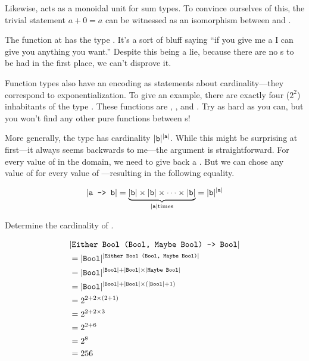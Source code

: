\documentclass[book.tex]{subfiles}
\begin{document}
Likewise,  acts as a monoidal unit for sum types. To convince ourselves
of this, the trivial statement $a+0 = a$ can be witnessed as an isomorphism
between  and .


The function  at  has the type . It's a sort of
bluff saying ``if you give me a  I can give you anything you
want.'' Despite this being a lie, because there are no s to be had in
the first place, we can't disprove it.

Function types also have an encoding as statements about cardinality---they
correspond to exponentialization. To give an example, there are exactly four
($2^2$) inhabitants of the type . These functions are ,
,  and . Try as hard as you can, but you
won't find any other pure functions between s!

More generally, the type  has cardinality $\lvert\texttt{b}\rvert^{\lvert\texttt{a}\rvert}$.
While this might be surprising at first---it always seems backwards to me---the
argument is straightforward. For every value of  in the domain, we need to
give back a . But we can chose any value of  for every value of
---resulting in the following equality.

$$
\lvert\texttt{a -> b}\rvert = \underbrace{\lvert\texttt{b}\rvert \times \lvert\texttt{b}\rvert \times \cdots \times
\lvert\texttt{b}\rvert}_{\lvert\texttt{a}\rvert \text{times}} = \lvert\texttt{b}\rvert^{\lvert\texttt{a}\rvert}
$$

\begin{exercise}
Determine the cardinality of .
\end{exercise}
\begin{solution}
$$
\begin{align*}
  &  \lvert\texttt{Either Bool (Bool, Maybe Bool) -> Bool}\rvert \\
  &= \lvert\texttt{Bool}\rvert^{\lvert\texttt{Either Bool (Bool, Maybe Bool)}\rvert} \\
  &= \lvert\texttt{Bool}\rvert^{\lvert\texttt{Bool}\rvert+\lvert\texttt{Bool}\rvert\times\lvert\texttt{Maybe Bool}\rvert} \\
  &= \lvert\texttt{Bool}\rvert^{\lvert\texttt{Bool}\rvert+\lvert\texttt{Bool}\rvert\times(\lvert\texttt{Bool}\rvert+1)} \\
  &= 2^{2+2\times(2+1)} \\
  &= 2^{2+2\times 3} \\
  &= 2^{2+6} \\
  &= 2^{8} \\
  &= 256
\end{align*}
$$
\end{solution}
\end{document}
